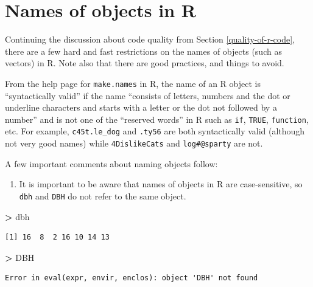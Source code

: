 \documentclass[]{krantz}
\makeatletter
\newenvironment{Shaded}{\begin{snugshade}}{\end{snugshade}}
\newcommand{\StringTok}[1]{\textcolor[rgb]{0.5,0.5,0.5}{#1}}
\newcommand{\OperatorTok}[1]{\textcolor[rgb]{0.43,0.43,0.43}{\textbf{#1}}}
\newcommand{\NormalTok}[1]{#1}
\providecommand{\tightlist}{%
  \setlength{\itemsep}{0pt}\setlength{\parskip}{0pt}}
\newenvironment{kframe}{%
\medskip{}
\setlength{\fboxsep}{.8em}
 \def\at@end@of@kframe{}%
 \ifinner\ifhmode%
  \def\at@end@of@kframe{\end{minipage}}%
  \begin{minipage}{\columnwidth}%
 \fi\fi%
 \def\FrameCommand##1{\hskip\@totalleftmargin \hskip-\fboxsep
 \colorbox{shadecolor}{##1}\hskip-\fboxsep
     \hskip-\linewidth \hskip-\@totalleftmargin \hskip\columnwidth}%
 \MakeFramed {\advance\hsize-\width
   \@totalleftmargin\z@ \linewidth\hsize
   \@setminipage}}%
 {\par\unskip\endMakeFramed%
 \at@end@of@kframe}
\renewenvironment{Shaded}{\begin{kframe}}{\end{kframe}}
\theoremstyle{definition}
\theoremstyle{definition}
\theoremstyle{definition}
\theoremstyle{remark}
\makeatother
\begin{document}
\section{Names of objects in R}\label{names-of-objects-in-r}

Continuing the discussion about code quality from Section
\ref{quality-of-r-code}, there are a few hard and fast restrictions on
the names of objects (such as vectors) in R. Note also that there are
good practices, and things to avoid.

From the help page for \texttt{make.names} in R, the name of an R object
is ``syntactically valid'' if the name ``consists of letters, numbers
and the dot or underline characters and starts with a letter or the dot
not followed by a number'' and is not one of the ``reserved words'' in R
such as \texttt{if}, \texttt{TRUE}, \texttt{function}, etc. For example,
\texttt{c45t.le\_dog} and \texttt{.ty56} are both syntactically valid
(although not very good names) while \texttt{4DislikeCats} and
\texttt{log\#@sparty} are not.

A few important comments about naming objects follow:

\begin{enumerate}
\def\labelenumi{\arabic{enumi}.}
\tightlist
\item
  It is important to be aware that names of objects in R are
  case-sensitive, so \texttt{dbh} and \texttt{DBH} do not refer to the
  same object.
\end{enumerate}

\begin{Shaded}
\begin{Highlighting}[]
\OperatorTok{>}\StringTok{ }\NormalTok{dbh}
\end{Highlighting}
\end{Shaded}

\begin{verbatim}
[1] 16  8  2 16 10 14 13
\end{verbatim}

\begin{Shaded}
\begin{Highlighting}[]
\OperatorTok{>}\StringTok{ }\NormalTok{DBH}
\end{Highlighting}
\end{Shaded}

\begin{verbatim}
Error in eval(expr, envir, enclos): object 'DBH' not found
\end{verbatim}
\end{document}
